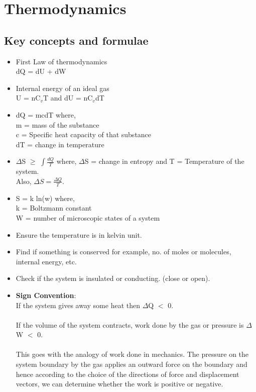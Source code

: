 \chapter{Thermodynamics}

\pagestyle{fancy}
\fancyhf{}
\fancyhead[OC]{\leftmark}
\fancyhead[EC]{\rightmark}
\cfoot{\thepage}

\section{Key concepts and formulae}
\begin{itemize}
    \item First Law of thermodynamics \\dQ = dU + dW
    
    \item Internal energy of an ideal gas \\U = nC$_v$T and dU = nC$_v$dT
    
    \item dQ = mcdT  where, \\m = mass of the substance \\c = Specific heat capacity of that substance \\dT = change in temperature
    
    \item 	$\Delta$S $\geq$ $\int \frac{dQ}{T}$ where, $\Delta$S = change in entropy and T = Temperature of the system.  \\Also, $\Delta S = \frac{\Delta Q}{T}$. 
    
    \item S = k ln(w) where,\\ k = Boltzmann constant\\ W = number of microscopic states of a system 
    
    \item	Ensure the temperature is in kelvin unit. 

    \item Find if something is conserved for example, no. of moles or molecules, internal energy, etc. 

    \item Check if the system is insulated or conducting. (close or open).
    
    \item \textbf{Sign Convention}: \\If the system gives away some heat then $\Delta$Q $<$ 0. \\ \\If the volume of the system contracts, work done by the gas or pressure is $\Delta$W $<$ 0. \\ \\This goes with the analogy of work done in mechanics. The pressure on the system boundary by the gas applies an outward force on the boundary and hence according to the choice of the directions of force and displacement vectors, we can determine whether the work is positive or negative. 
    

\end{itemize}
